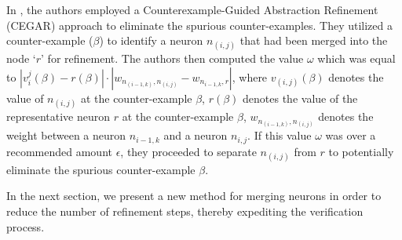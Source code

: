 In \cite{b2}, the authors employed a Counterexample-Guided Abstraction 
Refinement (CEGAR) approach to eliminate the spurious counter-examples. 
They utilized a counter-example ($\beta$) to identify a neuron $n_{(i, j)}$ 
that had been merged into the node `$r$' for refinement. The authors then 
computed the value $\omega$ which was equal to 
$|v_i^j(\beta) - r(\beta)| \cdot |w_{n_{(i-1, k)},n_{(i,j)}}-w_{n_{i-1,k},r}|$, 
where $v_{(i, j)}(\beta)$ denotes the value of $n_{(i, j)}$ at the 
counter-example $\beta$, $r(\beta)$ denotes the value of the 
representative neuron $r$ at the counter-example $\beta$, $w_{n_{(i-1,k)},n_{(i,j)}}$ 
denotes the weight between a neuron $n_{i-1,k}$ and a neuron $n_{i,j}$. 
If this value $\omega$ was over a recommended amount $\epsilon$, they proceeded to 
separate $n_{(i, j)}$ from $r$ to potentially eliminate the spurious counter-example 
$\beta$.



 In the next section, we present a new method for merging neurons in 
 order to reduce the number of refinement steps, thereby expediting the 
 verification process.
